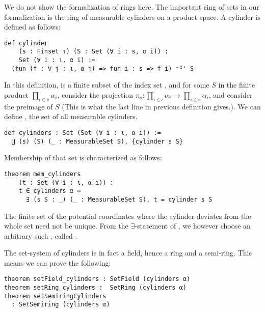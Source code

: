 \documentclass[lean]{DraftAFM}
\begin{document}
\noindent
We do not show the formalization of rings here.
The important ring of sets in our formalization is the ring of measurable cylinders on a product space.
A cylinder is defined as follows:

\begin{verbatim}
def cylinder
    (s : Finset ι) (S : Set (∀ i : s, α i)) :
    Set (∀ i : ι, α i) :=
  (fun (f : ∀ j : ι, α j) => fun i : s => f i) ⁻¹' S
\end{verbatim}

\noindent
In this definition,  is a finite subset of the index set
, and for some $S$ in the finite product $\prod_{i \in s}
\alpha_i$, consider the projection $\pi_s : \prod_{i \in \iota}
\alpha_i \to \prod_{i \in s} \alpha_i$, and consider the preimage of
$S$ (This is what the last line in previous definition gives.).
We can define , the set of all measurable cylinders.

\begin{verbatim}
def cylinders : Set (Set (∀ i : ι, α i)) :=
  ⋃ (s) (S) (_ : MeasurableSet S), {cylinder s S}
\end{verbatim}

\noindent
Membership of that set is characterized as follows:
\begin{verbatim}
theorem mem_cylinders
    (t : Set (∀ i : ι, α i)) :
    t ∈ cylinders α ↔
      ∃ (s S : _) (_ : MeasurableSet S), t = cylinder s S
\end{verbatim}
\noindent
The finite set  of the potential coordinates where
the cylinder deviates from the whole set need not be unique.
From the $\exists$-statement of , we however choose an
arbitrary such , called .


The set-system of cylinders is in fact a field, hence a ring and
a semi-ring. This means we can prove the following:

\begin{verbatim}
theorem setField_cylinders : SetField (cylinders α)
theorem setRing_cylinders :  SetRing (cylinders α)
theorem setSemiringCylinders
  : SetSemiring (cylinders α)
\end{verbatim}
\end{document}
